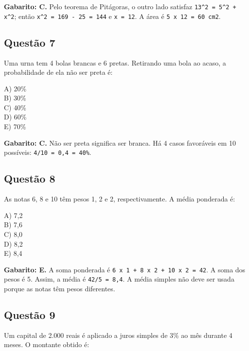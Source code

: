 \documentclass[11pt,a4paper]{article}
\begin{document}
\begin{alerta}
\textbf{Gabarito: C.} Pelo teorema de Pitágoras, o outro lado satisfaz \texttt{13\textasciicircum{}2 = 5\textasciicircum{}2 + x\textasciicircum{}2}; então \texttt{x\textasciicircum{}2 = 169 - 25 = 144} e \texttt{x = 12}. A área é \texttt{5 x 12 = 60 cm2}.
\end{alerta}

\subsection*{Questão 7}

Uma urna tem 4 bolas brancas e 6 pretas. Retirando uma bola ao acaso, a probabilidade de ela não ser preta é:

A) 20\% \\ B) 30\% \\ C) 40\% \\ D) 60\% \\ E) 70\%

\begin{alerta}
\textbf{Gabarito: C.} Não ser preta significa ser branca. Há 4 casos favoráveis em 10 possíveis: \texttt{4/10 = 0,4 = 40\%}.
\end{alerta}

\subsection*{Questão 8}

As notas 6, 8 e 10 têm pesos 1, 2 e 2, respectivamente. A média ponderada é:

A) 7,2 \\ B) 7,6 \\ C) 8,0 \\ D) 8,2 \\ E) 8,4

\begin{alerta}
\textbf{Gabarito: E.} A soma ponderada é \texttt{6 x 1 + 8 x 2 + 10 x 2 = 42}. A soma dos pesos é 5. Assim, a média é \texttt{42/5 = 8,4}. A média simples não deve ser usada porque as notas têm pesos diferentes.
\end{alerta}

\subsection*{Questão 9}

Um capital de 2.000 reais é aplicado a juros simples de 3\% ao mês durante 4 meses. O montante obtido é:
\end{document}

